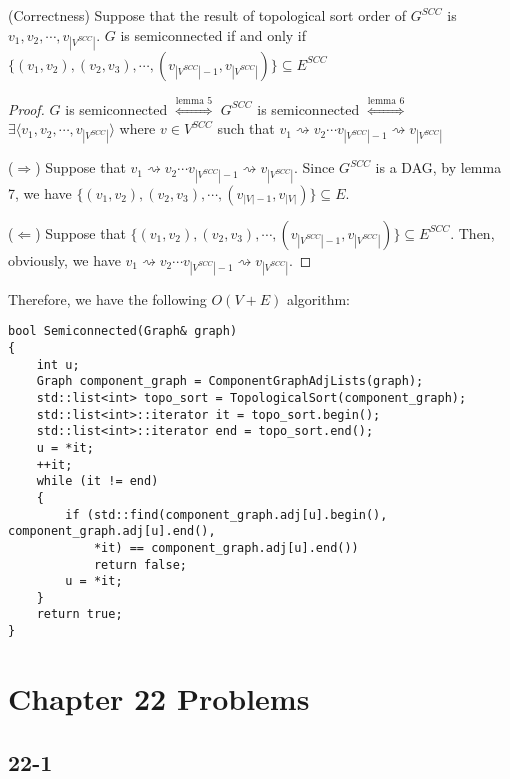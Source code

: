 \begin{theorem}{(Correctness)}
    Suppose that the result of topological sort order of $G^{SCC}$ is
    $v_1, v_2, \cdots, v_{|V^{SCC}|}$.
    $G$ is semiconnected if and only if 
    $\{ (v_1,v_2), (v_2,v_3), \cdots, (v_{|V^{SCC}|-1}, v_{|V^{SCC}|}) \} \subseteq E^{SCC}$
\end{theorem}

\begin{proof}
    $G$ is semiconnected
    $\overset{\text{lemma 5}}{\Longleftrightarrow}$
    $G^{SCC}$ is semiconnected
    $\overset{\text{lemma 6}}{\Longleftrightarrow}$\\
    $\exists \langle v_1, v_2, \cdots, v_{|V^{SCC}|} \rangle$ where $v \in V^{SCC}$ such that 
    $v_1 \rightsquigarrow v_2 \cdots v_{|V^{SCC}|-1} \rightsquigarrow v_{|V^{SCC}|}$

    ($\Longrightarrow$)
    Suppose that $v_1 \rightsquigarrow v_2 \cdots v_{|V^{SCC}|-1} \rightsquigarrow v_{|V^{SCC}|}$.
    Since $G^{SCC}$ is a DAG,
    by lemma 7, we have $\{ (v_1,v_2), (v_2,v_3), \cdots, (v_{|V|-1}, v_{|V|}) \} \subseteq E$.

    ($\Longleftarrow$)
    Suppose that $\{ (v_1,v_2), (v_2,v_3), \cdots, (v_{|V^{SCC}|-1}, v_{|V^{SCC}|}) \} \subseteq E^{SCC}$.
    Then, obviously, we have $v_1 \rightsquigarrow v_2 \cdots v_{|V^{SCC}|-1} \rightsquigarrow v_{|V^{SCC}|}$.
\end{proof}

Therefore, we have the following $O(V + E)$ algorithm:

\begin{verbatim}
bool Semiconnected(Graph& graph)
{
    int u;
    Graph component_graph = ComponentGraphAdjLists(graph);
    std::list<int> topo_sort = TopologicalSort(component_graph);
    std::list<int>::iterator it = topo_sort.begin();
    std::list<int>::iterator end = topo_sort.end();
    u = *it;
    ++it;
    while (it != end)
    {
        if (std::find(component_graph.adj[u].begin(), component_graph.adj[u].end(), 
            *it) == component_graph.adj[u].end())
            return false;
        u = *it;
    }
    return true;
}
\end{verbatim}

\section*{Chapter 22 Problems}

\subsection*{22-1}

